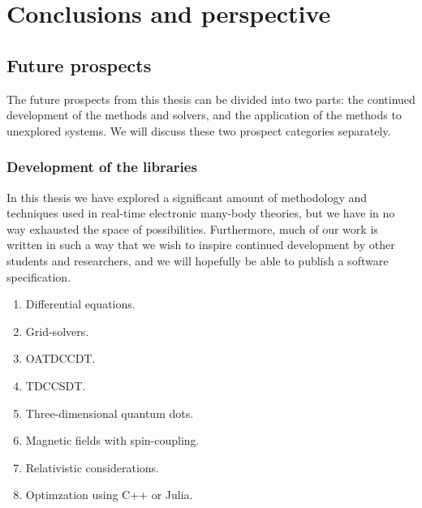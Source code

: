 \chapter{Conclusions and perspective}

    \section{Future prospects}
        \label{sec:future-work}
        The future prospects from this thesis can be divided into two parts: the
        continued development of the methods and solvers, and the application of
        the methods to unexplored systems.
        We will discuss these two prospect categories separately.

        \subsection{Development of the libraries}
            In this thesis we have explored a significant amount of methodology
            and techniques used in real-time electronic many-body theories, but
            we have in no way exhausted the space of possibilities.
            Furthermore, much of our work is written in such a way that we wish
            to inspire continued development by other students and researchers,
            and we will hopefully be able to publish a software specification.

            \begin{enumerate}
                \item Differential equations.
                \item Grid-solvers.
                \item OATDCCDT.
                \item TDCCSDT.
                \item Three-dimensional quantum dots.
                \item Magnetic fields with spin-coupling.
                \item Relativistic considerations.
                \item Optimzation using C++ or Julia.
            \end{enumerate}

